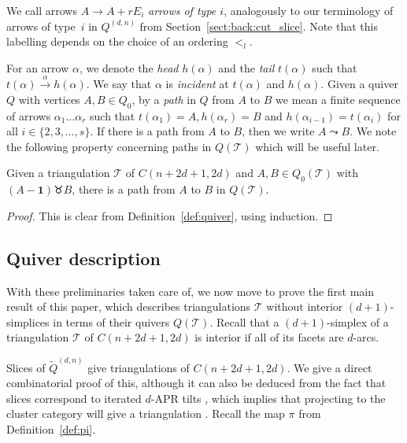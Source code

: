 \documentclass[ALCO,Unicode,published]{cedram}
\newcommand{\onevec}{\mathbf{1}} %
\newcommand{\ivec}{E_{i}} %
\newcommand{\rvec}{r\ivec} %
\newcommand{\tqdn}{\tilde{Q}^{(d, n)}}
\newcommand{\qdn}{Q^{(d, n)}}
\newcommand{\swr}{\taurus} %
\begin{document}
We call arrows $A \to A + \rvec$ \emph{arrows of type $i$}, analogously to our terminology of arrows of type~$i$ in $\qdn$ from Section~\ref{sect:back:cut_slice}. Note that this labelling depends on the choice of an ordering $<_{l}$.

For an arrow $\alpha$, we denote the \emph{head} $h(\alpha)$ and the \emph{tail} $t(\alpha)$ such that $t(\alpha) \xrightarrow{\alpha} h(\alpha)$. We say that $\alpha$ is \emph{incident} at $t(\alpha)$ and $h(\alpha)$. Given a quiver $Q$ with vertices $A,B \in Q_{0}$, by a \emph{path} in $Q$ from $A$ to $B$ we mean a finite sequence of arrows $\alpha_{1}\dots\alpha_{r}$ such that $t(\alpha_{1}) = A, h(\alpha_{r}) = B$ and $h(\alpha_{i - 1}) = t(\alpha_{i})$ for all $i \in \{2, 3, \dots, s\}$. If there is a path from $A$ to $B$, then we write $A \leadsto B$. We note the following property concerning paths in $Q(\mathcal{T})$ which will be useful later.

\begin{lemma}\label{lem:find_path}
Given a triangulation $\mathcal{T}$ of $C(n + 2d + 1, 2d)$ and $A, B \in Q_{0}(\mathcal{T})$ with $(A - \onevec) \swr B$, there is a path from $A$ to $B$ in $Q(\mathcal{T})$.
\end{lemma}
\begin{proof}
This is clear from Definition~\ref{def:quiver}, using induction.
\end{proof}

\subsection{Quiver description}\label{sect:main}

With these preliminaries taken care of, we now move to prove the first main result of this paper, which describes triangulations $\mathcal{T}$ without interior $(d + 1)$-simplices in terms of their quivers $Q(\mathcal{T})$. Recall that a $(d + 1)$-simplex of a triangulation $\mathcal{T}$ of $C(n + 2d + 1, 2d)$ is interior if all of its facets are $d$-arcs.

Slices of $\tqdn$ give triangulations of $C(n + 2d + 1, 2d)$. We give a direct combinatorial proof of this, although it can also be deduced from the fact that slices correspond to iterated $d$-APR tilts \cite[Theorem 4.15]{io}, which implies that projecting to the cluster category will give a triangulation \cite[Theorem 6.4]{ot}. Recall the map $\pi$ from Definition~\ref{def:pi}.
\end{document}
